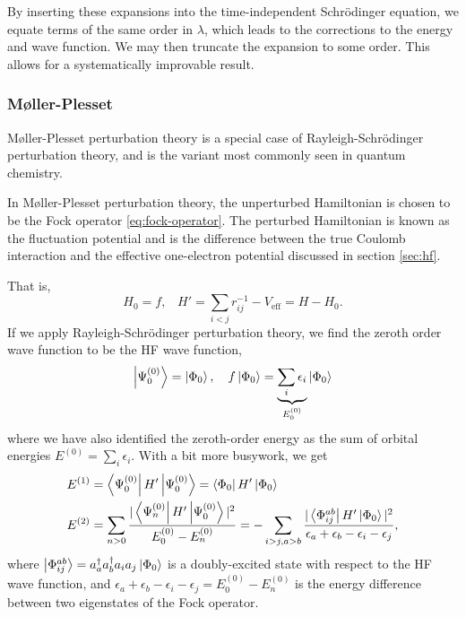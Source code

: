 By inserting these expansions into the time-independent Schr\"odinger equation, we equate terms of the same order in $\lambda$, which leads to the corrections to the energy and wave function. We may then truncate the expansion to some order. This allows for a systematically improvable result.

\subsubsection{M{\o}ller-Plesset}

M{\o}ller-Plesset perturbation theory\cite{mollerNote1934} is a special case of Rayleigh-Schr\"odinger perturbation theory, and is the variant most commonly seen in quantum chemistry.

In M{\o}ller-Plesset perturbation theory, the unperturbed Hamiltonian is chosen to be the Fock operator \ref{eq:fock-operator}. The perturbed Hamiltonian is known as the fluctuation potential and is the difference between the true Coulomb interaction and the effective one-electron potential discussed in section \ref{sec:hf}.

That is,
\begin{equation}
    H_0 = f, \hspace{10pt} H' = \sum_{i<j} r_{ij}^{-1}-V_\mathrm{eff} = H-H_0.
\end{equation}
If we apply Rayleigh-Schr\"odinger perturbation theory, we find the zeroth order wave function to be the \gls{HF} wave function,
\begin{equation}
    \ket{\Psi_0^{(0)}} = \ket{\Phi_0}, \hspace{10pt}
    f\ket{\Phi_0} = \underbrace{\sum_i\epsilon_i}_{E_0^{(0)}}\ket{\Phi_0}
\end{equation}
where we have also identified the zeroth-order energy as the sum of orbital energies $E^{(0)}=\sum_i\epsilon_i$. With a bit more busywork, we get
\begin{align}
    E^{(1)} &= \bra{\Psi_0^{(0)}}H'\ket{\Psi_0^{(0)}} = \bra{\Phi_0}H'\ket{\Phi_0} \\
    E^{(2)} &=
    \sum_{n>0} \frac{|\bra{\Psi_n^{(0)}}H'\ket{\Psi_0^{(0)}}|^2}{E_0^{(0)}-E_n^{(0)}} =
    -\sum_{i>j,a>b}\frac{|\bra{\Phi_{ij}^{ab}}H'\ket{\Phi_0}|^2}{\epsilon_a+\epsilon_b-\epsilon_i-\epsilon_j},
\end{align}
where $\ket{\Phi_{ij}^{ab}}=a_a^\dag a_b^\dag a_ia_j\ket{\Phi_0}$ is a doubly-excited state with respect to the HF wave function, and $\epsilon_a+\epsilon_b-\epsilon_i-\epsilon_j = E_0^{(0)} - E_n^{(0)}$ is the energy difference between two eigenstates of the Fock operator.

